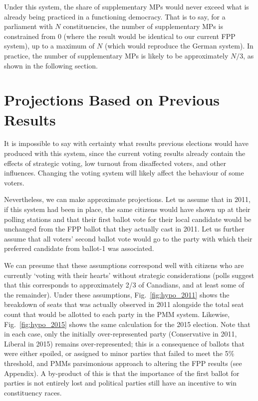 \documentclass[DIV=calc, paper=a4, fontsize=11pt, twocolumn]{scrartcl}	 %
\begin{document}
Under this system, the share of supplementary MPs would never exceed what is already being practiced in a functioning democracy. That is to say, for a parliament with $N$ constituencies, the number of supplementary MPs is constrained from 0 (where the result would be identical to our current FPP system), up to a maximum of $N$ (which would reproduce the German system). In practice, the number of supplementary MPs is likely to be approximately $N/3$, as shown in the following section.

\section{Projections Based on Previous Results}

It is impossible to say with certainty what results previous elections would have produced with this system, since the current voting results already contain the effects of strategic voting, low turnout from disaffected voters, and other influences. Changing the voting system will likely affect the behaviour of some voters.

Nevertheless, we can make approximate projections. Let us assume that in 2011, if this system had been in place, the same citizens would have shown up at their polling stations and that their first ballot vote for their local candidate would be unchanged from the FPP ballot that they actually cast in 2011. 
Let us further assume that all voters' second ballot vote would go to the party with which their preferred candidate from ballot-1 was associated. 

We can presume that these assumptions correspond well with citizens who are currently `voting with their hearts' without strategic considerations (polls suggest that this corresponds to approximately 2/3 of Canadians, and at least some of the remainder). Under these assumptions, Fig.~\ref{fig:hypo_2011} shows the breakdown of seats that was actually observed in 2011 alongside the total seat count that would be allotted to each party in the PMM system. Likewise, Fig.~\ref{fig:hypo_2015} shows the same calculation for the 2015 election. Note that in each case, only the initially over-represented party (Conservative in 2011, Liberal in 2015) remains over-represented; this is a consequence of ballots that were either spoiled, or assigned to minor parties that failed to meet the 5\% threshold, and PMMs parsimonious approach to altering the FPP results (see Appendix). A by-product of this is that the importance of the first ballot for parties is not entirely lost and political parties still have an incentive to win constituency races.
\end{document}
